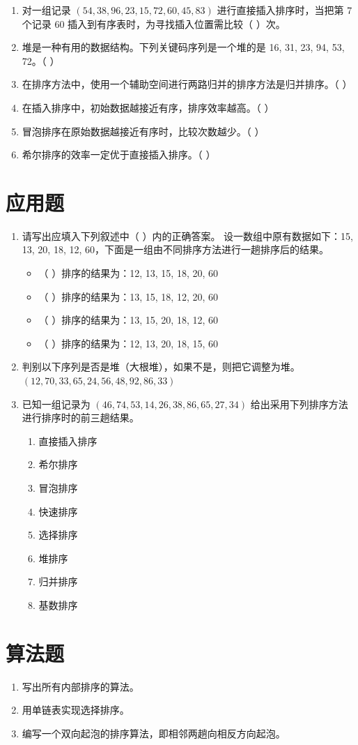 \documentclass[12pt, a4paper]{article}
\begin{document}
\begin{enumerate}
	\item 对一组记录 $(54, 38, 96, 23, 15, 72, 60, 45, 83)$ 进行直接插入排序时，当把第 7 个记录 60 插入到有序表时，为寻找插入位置需比较（ ）次。
	\item 堆是一种有用的数据结构。下列关键码序列是一个堆的是 16, 31, 23, 94, 53, 72。（ ）
	\item 在排序方法中，使用一个辅助空间进行两路归并的排序方法是归并排序。（ ）
	\item 在插入排序中，初始数据越接近有序，排序效率越高。（ ）
	\item 冒泡排序在原始数据越接近有序时，比较次数越少。（ ）
	\item 希尔排序的效率一定优于直接插入排序。（ ）
\end{enumerate}

\section*{应用题}

\begin{enumerate}
	\item 请写出应填入下列叙述中（ ）内的正确答案。
	      设一数组中原有数据如下：15, 13, 20, 18, 12, 60，下面是一组由不同排序方法进行一趟排序后的结果。
	      \begin{itemize}
		      \item （ ）排序的结果为：12, 13, 15, 18, 20, 60
		      \item （ ）排序的结果为：13, 15, 18, 12, 20, 60
		      \item （ ）排序的结果为：13, 15, 20, 18, 12, 60
		      \item （ ）排序的结果为：12, 13, 20, 18, 15, 60
	      \end{itemize}

	\item 判别以下序列是否是堆（大根堆），如果不是，则把它调整为堆。
	      $(12, 70, 33, 65, 24, 56, 48, 92, 86, 33)$

	\item 已知一组记录为 $(46, 74, 53, 14, 26, 38, 86, 65, 27, 34)$ 给出采用下列排序方法进行排序时的前三趟结果。
	      \begin{enumerate}
		      \item 直接插入排序
		      \item 希尔排序
		      \item 冒泡排序
		      \item 快速排序
		      \item 选择排序
		      \item 堆排序
		      \item 归并排序
		      \item 基数排序
	      \end{enumerate}
\end{enumerate}

\section*{算法题}

\begin{enumerate}
	\item 写出所有内部排序的算法。
	\item 用单链表实现选择排序。
	\item 编写一个双向起泡的排序算法，即相邻两趟向相反方向起泡。
\end{enumerate}
\end{document}
